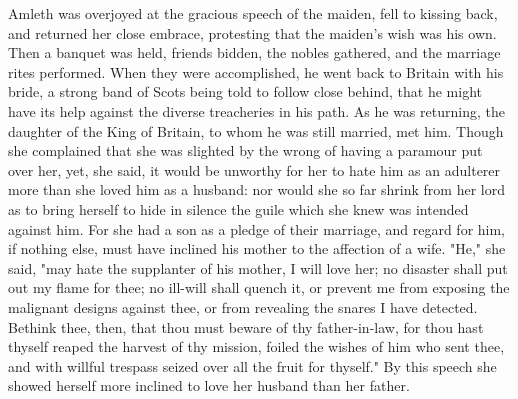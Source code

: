 \documentclass[10pt,a4paper]{report}
\begin{document}
Amleth was overjoyed at the gracious speech of the maiden, fell to kissing back, and returned her close embrace, protesting that the maiden's wish was his own. Then a banquet was held, friends bidden, the nobles gathered, and the marriage rites performed. When they were accomplished, he went back to Britain with his bride, a strong band of Scots being told to follow close behind, that he might have its help against the diverse treacheries in his path. As he was returning, the daughter of the King of Britain, to whom he was still married, met him. Though she complained that she was slighted by the wrong of having a paramour put over her, yet, she said, it would be unworthy for her to hate him as an adulterer more than she loved him as a husband: nor would she so far shrink from her lord as to bring herself to hide in silence the guile which she knew was intended against him. For she had a son as a pledge of their marriage, and regard for him, if nothing else, must have inclined his mother to the affection of a wife. "He," she said, "may hate the supplanter of his mother, I will love her; no disaster shall put out my flame for thee; no ill-will shall quench it, or prevent me from exposing the malignant designs against thee, or from revealing the snares I have detected. Bethink thee, then, that thou must beware of thy father-in-law, for thou hast thyself reaped the harvest of thy mission, foiled the wishes of him who sent thee, and with willful trespass seized over all the fruit for thyself." By this speech she showed herself more inclined to love her husband than her father.\\
\end{document}
